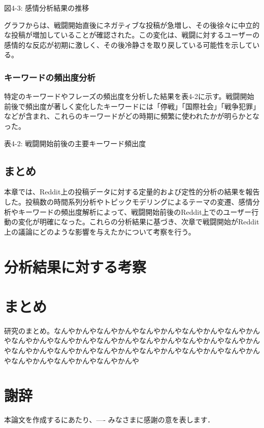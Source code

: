 \documentclass[11pt, a4j]{jreport}
\begin{document}
    図4-3: 感情分析結果の推移

    グラフからは、戦闘開始直後にネガティブな投稿が急増し、その後徐々に中立的な投稿が増加していることが確認された。この変化は、戦闘に対するユーザーの感情的な反応が初期に激しく、その後冷静さを取り戻している可能性を示している。

    \subsection{キーワードの頻出度分析}
    特定のキーワードやフレーズの頻出度を分析した結果を表4-2に示す。戦闘開始前後で頻出度が著しく変化したキーワードには「停戦」「国際社会」「戦争犯罪」などが含まれ、これらのキーワードがどの時期に頻繁に使われたかが明らかとなった。

    表4-2: 戦闘開始前後の主要キーワード頻出度

    \section{まとめ}
    本章では、Reddit上の投稿データに対する定量的および定性的分析の結果を報告した。投稿数の時間系列分析やトピックモデリングによるテーマの変遷、感情分析やキーワードの頻出度解析によって、戦闘開始前後のReddit上でのユーザー行動の変化が明確になった。これらの分析結果に基づき、次章で戦闘開始がReddit上の議論にどのような影響を与えたかについて考察を行う。

    \chapter{分析結果に対する考察}

    \chapter{まとめ}
    研究のまとめ。なんやかんやなんやかんやなんやかんやなんやかんやなんやかんやなんやかんやなんやかんやなんやかんやなんやかんやなんやかんやなんやかんやなんやかんやなんやかんやなんやかんやなんやかんやなんやかんやなんやかんやなんやかんやなんやかんやなんやかんや

    \chapter*{謝辞} %
    本論文を作成するにあたり、---- みなさまに感謝の意を表します．


    \renewcommand{\bibname}{参考文献} %
\end{document}
